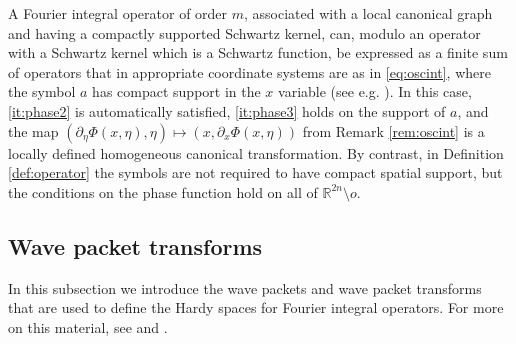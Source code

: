 \documentclass{amsart}
\newcommand {\R}{\mathbb R}
\theoremstyle{definition}
\numberwithin{equation}{section}
\begin{document}
A Fourier integral operator of order $m$, associated with a local canonical graph and having a compactly supported Schwartz kernel, can, modulo an operator with a Schwartz kernel which is a Schwartz function, be expressed as a finite sum of operators that in appropriate coordinate systems are as in \eqref{eq:oscint}, where the symbol $a$ has compact support in the $x$ variable (see e.g. \cite[Proposition 6.2.4]{Sogge17}). In this case, \eqref{it:phase2} is automatically satisfied, \eqref{it:phase3} holds on the support of $a$, and the map $(\partial_{\eta}\Phi(x,\eta),\eta)\mapsto (x,\partial_{x}\Phi(x,\eta))$ from Remark \ref{rem:oscint} is a locally defined homogeneous canonical transformation. By contrast, in Definition \ref{def:operator} the symbols are not required to have compact spatial support, but the conditions on the phase function hold on all of $\R^{2n}\setminus o$.





\subsection{Wave packet transforms}\label{subsec:transforms}

In this subsection we introduce the wave packets and wave packet transforms that are used to define the Hardy spaces for Fourier integral operators. For more on this material, see \cite[Section 4]{HaPoRo20} and \cite[Section 3]{Rozendaal21}.
\end{document}
